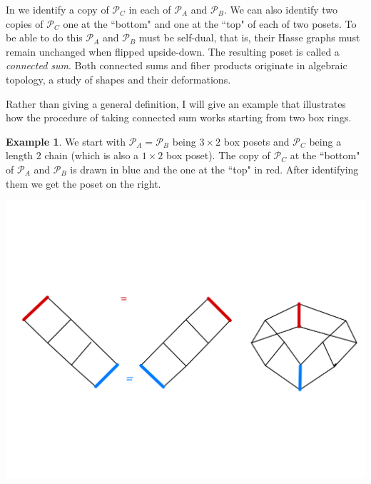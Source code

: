 \documentclass[11pt]{amsart}
\renewcommand{\P}{{\mathcal P}}
\theoremstyle{plain} %
\theoremstyle{definition}
\newtheorem{ex}[thm]{Example}
\theoremstyle{remark}
\numberwithin{equation}{section}  %
\begin{document}
In  we identify a copy of $\P_C$ in each of $\P_A$ and $\P_B$. We can also identify two copies of $\P_C$ one at the ``bottom" and one at the ``top" of each of two posets. To be able to do this $\P_A$ and $\P_B$ must be self-dual, that is, their Hasse graphs must remain unchanged when flipped upside-down. The resulting poset is called a {\em connected sum}. Both connected sums and fiber products originate in algebraic topology, a study of shapes and their deformations.

Rather than giving a general definition, I will give an example that illustrates how the procedure of taking connected sum works starting from two box rings.


\begin{ex}\label{ex: connected sum}
We start with $\P_A=\P_B$ being $3\times 2$ box posets and $\P_C$ being a length $2$ chain (which is also a $1\times 2$ box poset). The copy of $\P_C$ at the ``bottom" of $\P_A$ and $\P_B$ is drawn in blue and the one at the ``top" in red. After identifying them we get the poset on the right.
\begin{center}
\includegraphics[width=\textwidth]{Pictures/ConnectedSum.pdf}
\end{center}
\end{ex}
\end{document}

